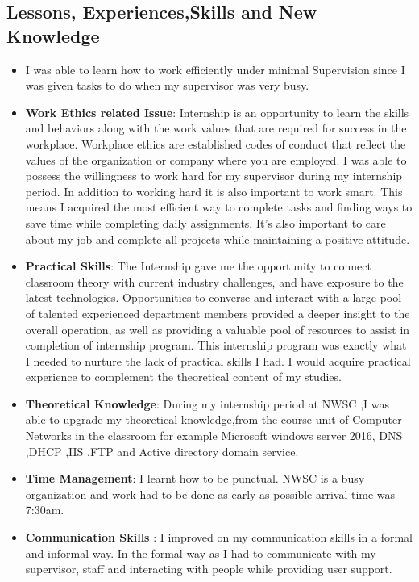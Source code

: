 \documentclass{article}
\begin{document}
\subsection{Lessons, Experiences,Skills and New Knowledge}
\begin{itemize}
\item I was able to learn how to work efficiently under minimal Supervision since I was given tasks to do when my supervisor was very busy.
  \item \textbf{Work Ethics related Issue}: Internship is an opportunity to learn the skills and behaviors along with the work values that are required for success in the workplace. Workplace ethics are established codes of conduct that reflect the values of the organization or company where you are employed. I was able to possess the willingness to work hard for my supervisor during my internship period. In addition to working hard it is also important to work smart. This means I acquired the most efficient way to complete tasks and finding ways to save time while completing daily assignments. It's also important to care about my job and complete all projects while maintaining a positive attitude.
\item \textbf{Practical Skills}: The Internship gave me  the opportunity to connect classroom theory with current industry challenges, and have exposure to the latest technologies. Opportunities to converse and interact with a large pool of talented experienced department members  provided a deeper insight to the overall operation, as well as providing a valuable pool of resources to assist in completion of internship program. This internship program was exactly what I needed to nurture the lack of practical skills I had. I would acquire practical experience to complement the theoretical content of my studies.
\item \textbf{Theoretical Knowledge}: During my internship period at NWSC ,I was able to  upgrade my theoretical knowledge,from the course unit  of  Computer Networks in the classroom for example Microsoft windows server 2016, DNS ,DHCP ,IIS ,FTP and Active directory domain service.
  \item \textbf{Time Management}:  I learnt how to be punctual. NWSC is a busy organization and work had to be done as early as possible arrival time was 7:30am.
\item \textbf{Communication Skills} : I improved on my  communication skills in a formal and informal way. In the formal way as I had to communicate with my supervisor, staff and interacting with people while providing user support.

\end{itemize}
\end{document}
